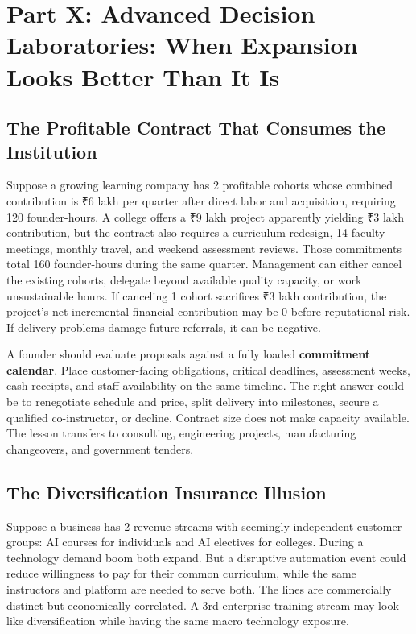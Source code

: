 \section*{Part X: Advanced Decision Laboratories: When Expansion Looks Better Than It Is}
\label{sec:part10_advanced_decision_laboratories}

\subsection{The Profitable Contract That Consumes the Institution}
\label{sec:profitable_contract_consumes_institution}

Suppose a growing learning company has 2 profitable cohorts whose combined contribution is ₹6 lakh per quarter after direct labor and acquisition, requiring 120 founder-hours. A college offers a ₹9 lakh project apparently yielding ₹3 lakh contribution, but the contract also requires a curriculum redesign, 14 faculty meetings, monthly travel, and weekend assessment reviews. Those commitments total 160 founder-hours during the same quarter. Management can either cancel the existing cohorts, delegate beyond available quality capacity, or work unsustainable hours. If canceling 1 cohort sacrifices ₹3 lakh contribution, the project's net incremental financial contribution may be 0 before reputational risk. If delivery problems damage future referrals, it can be negative.

A founder should evaluate proposals against a fully loaded \textbf{commitment calendar}. Place customer-facing obligations, critical deadlines, assessment weeks, cash receipts, and staff availability on the same timeline. The right answer could be to renegotiate schedule and price, split delivery into milestones, secure a qualified co-instructor, or decline. Contract size does not make capacity available. The lesson transfers to consulting, engineering projects, manufacturing changeovers, and government tenders.

\subsection{The Diversification Insurance Illusion}
\label{sec:diversification_insurance_illusion}

Suppose a business has 2 revenue streams with seemingly independent customer groups: AI courses for individuals and AI electives for colleges. During a technology demand boom both expand. But a disruptive automation event could reduce willingness to pay for their common curriculum, while the same instructors and platform are needed to serve both. The lines are commercially distinct but economically correlated. A 3rd enterprise training stream may look like diversification while having the same macro technology exposure.

